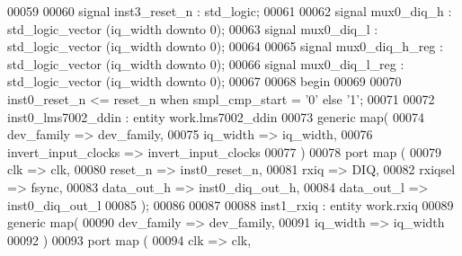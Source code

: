 \begin{DoxyCode}
00059 
00060 \textcolor{keywordflow}{signal} \textcolor{vhdlchar}{inst3_reset_n}    \textcolor{vhdlchar}{:} \textcolor{comment}{std\_logic}; 
00061 
00062 \textcolor{keywordflow}{signal} \textcolor{vhdlchar}{mux0_diq_h}       \textcolor{vhdlchar}{:} \textcolor{comment}{std\_logic\_vector} \textcolor{vhdlchar}{(}\textcolor{vhdlchar}{iq_width} \textcolor{keywordflow}{downto} \textcolor{vhdllogic}{}\textcolor{vhdllogic}{0}\textcolor{vhdlchar}{)}; 
00063 \textcolor{keywordflow}{signal} \textcolor{vhdlchar}{mux0_diq_l}       \textcolor{vhdlchar}{:} \textcolor{comment}{std\_logic\_vector} \textcolor{vhdlchar}{(}\textcolor{vhdlchar}{iq_width} \textcolor{keywordflow}{downto} \textcolor{vhdllogic}{}\textcolor{vhdllogic}{0}\textcolor{vhdlchar}{)};
00064 
00065 \textcolor{keywordflow}{signal} \textcolor{vhdlchar}{mux0_diq_h_reg}   \textcolor{vhdlchar}{:} \textcolor{comment}{std\_logic\_vector} \textcolor{vhdlchar}{(}\textcolor{vhdlchar}{iq_width} \textcolor{keywordflow}{downto} \textcolor{vhdllogic}{}\textcolor{vhdllogic}{0}\textcolor{vhdlchar}{)}; 
00066 \textcolor{keywordflow}{signal} \textcolor{vhdlchar}{mux0_diq_l_reg}   \textcolor{vhdlchar}{:} \textcolor{comment}{std\_logic\_vector} \textcolor{vhdlchar}{(}\textcolor{vhdlchar}{iq_width} \textcolor{keywordflow}{downto} \textcolor{vhdllogic}{}\textcolor{vhdllogic}{0}\textcolor{vhdlchar}{)};
00067   
00068 \textcolor{vhdlkeyword}{begin}
00069 
00070 inst0\_reset\_n <= reset\_n \textcolor{keywordflow}{when} smpl\_cmp\_start = '0' \textcolor{keywordflow}{else} '1';
00071 
00072 inst0\_lms7002\_ddin : \textcolor{keywordflow}{entity} work.lms7002_ddin
00073    \textcolor{keywordflow}{generic} \textcolor{keywordflow}{map}( 
00074       dev_family           => dev_family,
00075       iq_width             => iq_width,
00076       invert_input_clocks  => invert_input_clocks
00077    \textcolor{vhdlchar}{)}
00078    \textcolor{keywordflow}{port} \textcolor{keywordflow}{map} (
00079       clk         => clk,
00080       reset_n     => inst0_reset_n, 
00081       rxiq        => DIQ, 
00082       rxiqsel     => fsync, 
00083       data_out_h  => inst0_diq_out_h, 
00084       data_out_l  => inst0_diq_out_l 
00085         \textcolor{vhdlchar}{)};
00086         
00087         
00088 inst1\_rxiq : \textcolor{keywordflow}{entity} work.rxiq
00089    \textcolor{keywordflow}{generic} \textcolor{keywordflow}{map}( 
00090       dev_family           => dev_family,
00091       iq_width             => iq_width
00092    \textcolor{vhdlchar}{)}
00093    \textcolor{keywordflow}{port} \textcolor{keywordflow}{map} (
00094       clk         => clk,

\end{DoxyCode}
